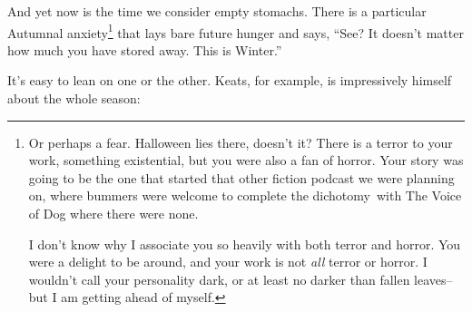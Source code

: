 \documentclass[12pt]{memoir}
\begin{document}
And yet now is the time we consider empty stomachs. There is a particular Autumnal anxiety\footnote{Or perhaps a fear. Halloween lies there, doesn't it? There is a terror to your work, something existential, but you were also a fan of horror. Your story was going to be the one that started that other fiction podcast we were planning on, where bummers were welcome to complete the dichotomy\footnotemark~with The Voice of Dog where there were none.\par
I don't know why I associate you so heavily with both terror and horror. You were a delight to be around, and your work is not \emph{all} terror or horror. I wouldn't call your personality dark, or at least no darker than fallen leaves-- but I am getting ahead of myself.}
 that lays bare future hunger and says, ``See? It doesn't matter how much you have stored away. This is Winter.''

It's easy to lean on one or the other. Keats, for example, is impressively himself about the whole season:
\end{document}
